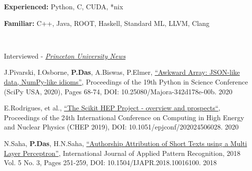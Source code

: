 \documentclass[10pt, letterpaper]{fulldeps}
\begin{document}
%
%
\vspace{-4pt}
\textbf{Experienced:} Python, C, CUDA, *nix

\textbf{Familiar:} C++, Java, ROOT, Haskell,  Standard ML, LLVM, Clang
\vspace{-6pt}

%
%
\vspace{-4pt}
\\
\vspace{-15pt}
\begin{tightitemize}
\item Interviewed - \textit{\href{https://www.princeton.edu/news/2019/08/19/princeton-leads-efforts-develop-national-data-training-framework-high-energy}{Princeton University News}}
\end{tightitemize}
\vspace{-7pt}

%
%
\small{\begin{tightitemize}
    \item J.Pivarski, I.Osborne, {\textbf{P.Das}}, A.Biswas, P.Elmer, {\href{http://conference.scipy.org/proceedings/scipy2020/jim_pivarski.html}{``Awkward Array: JSON-like data, NumPy-like idioms''}}, Proceedings of the 19th Python in Science Conference (SciPy USA, 2020), Pages 68-74, DOI: 10.25080/Majora-342d178e-00b. \hfill{2020}
    \item E.Rodrigues, et al., {\href{https://www.epj-conferences.org/articles/epjconf/abs/2020/21/epjconf_chep2020_06028/epjconf_chep2020_06028.html}{``The Scikit HEP Project - overview and prospects``}}, Proceedings of the 24th International Conference on Computing in High Energy and Nuclear Physics (CHEP 2019), DOI: 10.1051/epjconf/202024506028.  \hfill{2020}
    \item N.Saha, {\textbf{P.Das}}, H.N.Saha, {\href{https://www.inderscienceonline.com/doi/abs/10.1504/IJAPR.2018.094819}{``Authorship Attribution of Short Texts using a Multi Layer Perceptron''}}, International Journal of Applied Pattern Recognition, 2018 Vol. 5 No. 3, Pages 251-259, DOI: 10.1504/IJAPR.2018.10016100. \hfill{2018}
\end{tightitemize}}
\end{document}
